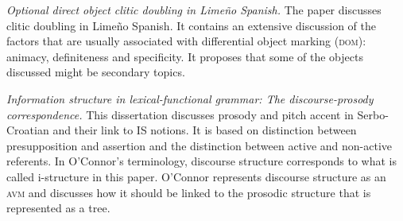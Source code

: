 \documentclass[output=paper,hidelinks]{langscibook}
\begin{document}
\vspace{+6pt} 
\citet{Mayer06} \textit{Optional direct object clitic doubling in Limeño Spanish.} The paper discusses clitic doubling in Limeño Spanish. It contains an extensive discussion of the factors that are usually associated with differential object marking (\textsc{dom}):  animacy, definiteness and specificity. It proposes that some of the objects discussed might be secondary topics. 


\vspace{+6pt}
\citet{Connor2006} \textit{Information structure in lexical-functional grammar: The dis\-course-prosody correspondence.} This dissertation discusses prosody and pitch accent in Serbo-Croatian and their link to IS notions. It is based on  distinction between presupposition and assertion and the distinction between active and non-active referents. %
In O'Connor's terminology, discourse structure corresponds to what is called i-structure in this paper. O'Connor represents discourse structure as an \textsc{avm} and discusses how it should be linked to the prosodic structure that is represented as a tree.
\end{document}
